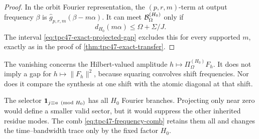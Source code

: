 \begin{proof}
In the orbit Fourier representation, the \((p,r,m)\)-term at output
frequency \(\beta\) is
\(\widehat g_{p,r,m}(\beta-m\alpha)\).  It can meet
\(\mathcal B_{\Omega}^{(H_0)}\) only if
\[
 d_{H_0}(m\alpha)
 \le\Omega+\Sigma/J.
\]
The interval \eqref{eq:tpc47-exact-projected-gap} excludes this for
every supported \(m\), exactly as in the proof of
\cref{thm:tpc47-exact-transfer}.
\end{proof}

\begin{remark}
\label{rem:tpc47-amplitude-not-energy}
The vanishing concerns the Hilbert-valued amplitude
\(h\mapsto\Pi_{\Omega}^{(H_0)}F_h\).  It does not imply a gap for
\(h\mapsto\|F_h\|^2\), because squaring convolves shift frequencies.
Nor does it compare the synthesis at one shift with the atomic diagonal
at that shift.
\end{remark}

\begin{remark}
\label{rem:tpc47-residue-comb}
The selector \(\mathbf 1_{j\equiv a\pmod{H_0}}\) has all \(H_0\) Fourier
branches.  Projecting only near zero would define a smaller valid
sector, but it would suppress the other inherited residue modes.  The
comb \eqref{eq:tpc47-frequency-comb} retains them all and changes the
time--bandwidth trace only by the fixed factor \(H_0\).
\end{remark}
